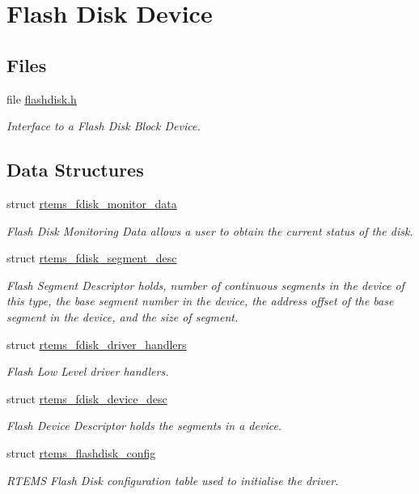 \hypertarget{group__RTEMSFDisk}{}\section{Flash Disk Device}
\label{group__RTEMSFDisk}
\subsection*{Files}
\begin{DoxyCompactItemize}
\item 
file \mbox{\hyperlink{flashdisk_8h}{flashdisk.\+h}}
\begin{DoxyCompactList}\small\item\em Interface to a Flash Disk Block Device. \end{DoxyCompactList}\end{DoxyCompactItemize}
\subsection*{Data Structures}
\begin{DoxyCompactItemize}
\item 
struct \mbox{\hyperlink{structrtems__fdisk__monitor__data}{rtems\+\_\+fdisk\+\_\+monitor\+\_\+data}}
\begin{DoxyCompactList}\small\item\em Flash Disk Monitoring Data allows a user to obtain the current status of the disk. \end{DoxyCompactList}\item 
struct \mbox{\hyperlink{structrtems__fdisk__segment__desc}{rtems\+\_\+fdisk\+\_\+segment\+\_\+desc}}
\begin{DoxyCompactList}\small\item\em Flash Segment Descriptor holds, number of continuous segments in the device of this type, the base segment number in the device, the address offset of the base segment in the device, and the size of segment. \end{DoxyCompactList}\item 
struct \mbox{\hyperlink{structrtems__fdisk__driver__handlers}{rtems\+\_\+fdisk\+\_\+driver\+\_\+handlers}}
\begin{DoxyCompactList}\small\item\em Flash Low Level driver handlers. \end{DoxyCompactList}\item 
struct \mbox{\hyperlink{structrtems__fdisk__device__desc}{rtems\+\_\+fdisk\+\_\+device\+\_\+desc}}
\begin{DoxyCompactList}\small\item\em Flash Device Descriptor holds the segments in a device. \end{DoxyCompactList}\item 
struct \mbox{\hyperlink{structrtems__flashdisk__config}{rtems\+\_\+flashdisk\+\_\+config}}
\begin{DoxyCompactList}\small\item\em R\+T\+E\+MS Flash Disk configuration table used to initialise the driver. \end{DoxyCompactList}\end{DoxyCompactItemize}
